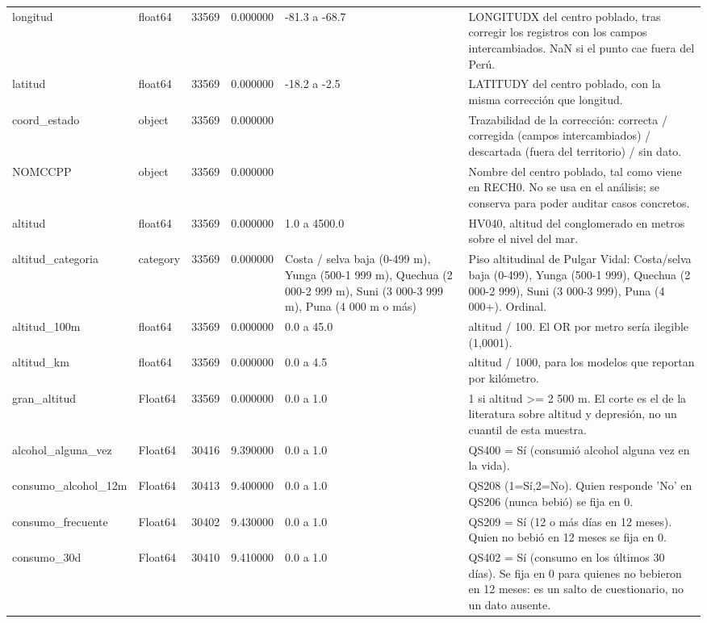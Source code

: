 \begin{longtable}{llrrll}
longitud & float64 & 33569 & 0.000000 & -81.3 a -68.7 & LONGITUDX del centro poblado, tras corregir los registros con los campos intercambiados. NaN si el punto cae fuera del Perú. \\
latitud & float64 & 33569 & 0.000000 & -18.2 a -2.5 & LATITUDY del centro poblado, con la misma corrección que longitud. \\
coord\_estado & object & 33569 & 0.000000 &  & Trazabilidad de la corrección: correcta / corregida (campos intercambiados) / descartada (fuera del territorio) / sin dato. \\
NOMCCPP & object & 33569 & 0.000000 &  & Nombre del centro poblado, tal como viene en RECH0. No se usa en el análisis; se conserva para poder auditar casos concretos. \\
altitud & float64 & 33569 & 0.000000 & 1.0 a 4500.0 & HV040, altitud del conglomerado en metros sobre el nivel del mar. \\
altitud\_categoria & category & 33569 & 0.000000 & Costa / selva baja (0-499 m), Yunga (500-1 999 m), Quechua (2 000-2 999 m), Suni (3 000-3 999 m), Puna (4 000 m o más) & Piso altitudinal de Pulgar Vidal: Costa/selva baja (0-499), Yunga (500-1 999), Quechua (2 000-2 999), Suni (3 000-3 999), Puna (4 000+). Ordinal. \\
altitud\_100m & float64 & 33569 & 0.000000 & 0.0 a 45.0 & altitud / 100. El OR por metro sería ilegible (1,0001). \\
altitud\_km & float64 & 33569 & 0.000000 & 0.0 a 4.5 & altitud / 1000, para los modelos que reportan por kilómetro. \\
gran\_altitud & Float64 & 33569 & 0.000000 & 0.0 a 1.0 & 1 si altitud >= 2 500 m. El corte es el de la literatura sobre altitud y depresión, no un cuantil de esta muestra. \\
alcohol\_alguna\_vez & Float64 & 30416 & 9.390000 & 0.0 a 1.0 & QS400 = Sí (consumió alcohol alguna vez en la vida). \\
consumo\_alcohol\_12m & Float64 & 30413 & 9.400000 & 0.0 a 1.0 & QS208 (1=Sí,2=No). Quien responde 'No' en QS206 (nunca bebió) se fija en 0. \\
consumo\_frecuente & Float64 & 30402 & 9.430000 & 0.0 a 1.0 & QS209 = Sí (12 o más días en 12 meses). Quien no bebió en 12 meses se fija en 0. \\
consumo\_30d & Float64 & 30410 & 9.410000 & 0.0 a 1.0 & QS402 = Sí (consumo en los últimos 30 días). Se fija en 0 para quienes no bebieron en 12 meses: es un salto de cuestionario, no un dato ausente. \\

\end{longtable}
